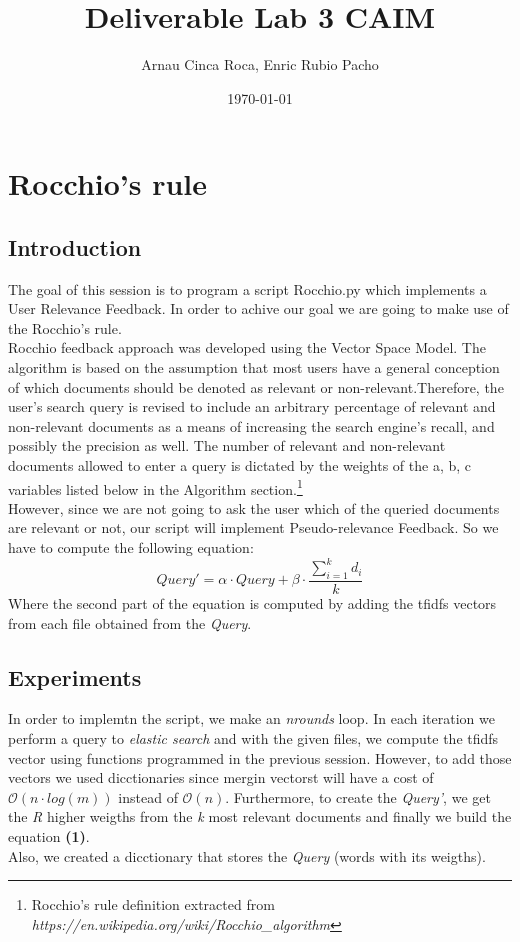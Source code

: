 \documentclass[11pt]{article}
\title{Deliverable Lab 3 CAIM}
\author{Arnau Cinca Roca, Enric Rubio Pacho}
\date\today
\begin{document}
\maketitle

\section{Rocchio's rule}
\subsection{Introduction}
The goal of this session is to program a script Rocchio.py which implements a User Relevance Feedback. In order to achive our goal we are going to make use of the Rocchio's rule.\\
Rocchio feedback approach was developed using the Vector Space Model. The algorithm is based on the assumption that most users have a general conception of which documents should be denoted as relevant or non-relevant.Therefore, the user's search query is revised to include an arbitrary percentage of relevant and non-relevant documents as a means of increasing the search engine's recall, and possibly the precision as well. The number of relevant and non-relevant documents allowed to enter a query is dictated by the weights of the a, b, c variables listed below in the Algorithm section.\footnote{Rocchio's rule definition extracted from \textit{https://en.wikipedia.org/wiki/Rocchio\_algorithm}} \\
However, since we are not going to ask the user which of the queried documents are relevant or not, our script will implement Pseudo-relevance Feedback. So we have to compute the following equation:
\begin{equation}
Query' = \alpha\cdot Query + \beta\cdot \frac{\sum\limits_{i = 1}^{k}d_i}{k}
\end{equation}
Where the second part of the equation is computed by adding the tfidfs vectors from each file obtained from the \textit{Query}. 
\subsection{Experiments}
In order to implemtn the script, we make an \textit{nrounds} loop. In each iteration we perform a query to \textit{elastic search} and with the given files, we compute the tfidfs vector using functions programmed in the previous session. However, to add those vectors we used dicctionaries since mergin vectorst will have a cost of $\mathcal{O}(n\cdot log(m))$ instead of $\mathcal{O}(n)$.
Furthermore, to create the \textit{Query'}, we get the \textit{R} higher weigths from the \textit{k} most relevant documents and finally we build the equation \textbf{(1)}.\\
Also, we created a dicctionary that stores the \textit{Query} (words with its weigths).
\end{document}
